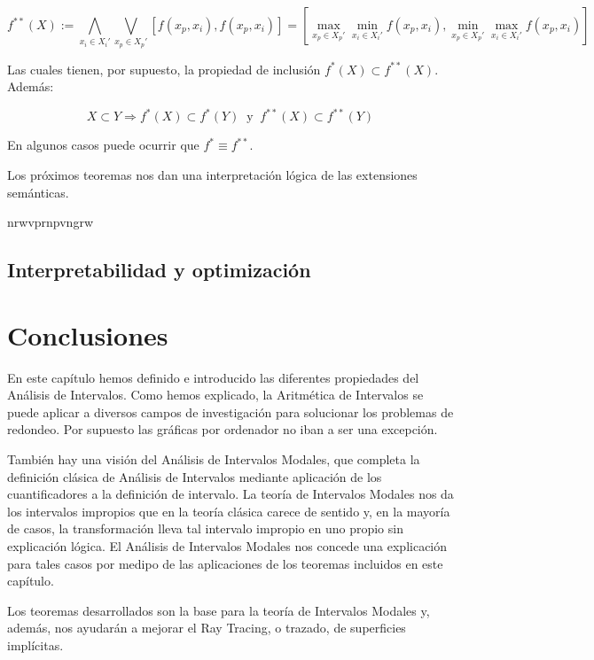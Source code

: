 \begin{equation}
f^{**}(X) := \bigwedge_{x_i \in X_i'} \bigvee_{x_p \in X_p'} [f(x_p,x_i),f(x_p,x_i)] = \left[ \max_{x_p \in X_p'} \min_{x_i \in X_i'} f(x_p,x_i), \min_{x_p \in X_p'} \max_{x_i \in X_i'} f(x_p,x_i) \right]
\nonumber
\end{equation}

Las cuales tienen, por supuesto, la propiedad de inclusión $f^*(X) \subset f^{**}(X)$. Además:

\begin{equation}
X \subset Y \Rightarrow f^*(X) \subset f^*(Y) \ \text{ y } \ f^{**}(X) \subset f^{**}(Y)
\nonumber
\end{equation}

En algunos casos puede ocurrir que $f^* \equiv f^{**}$.
\par Los próximos teoremas nos dan una interpretación lógica de las extensiones semánticas.

\begin{theorem}
nrwvprnpvngrw
\end{theorem}

\subsection{Interpretabilidad y optimización}

\section{Conclusiones}

En este capítulo hemos definido e introducido las diferentes propiedades del Análisis de Intervalos. Como hemos explicado, la Aritmética de Intervalos se puede aplicar a diversos campos de investigación para solucionar los problemas de redondeo. Por supuesto las gráficas por ordenador no iban a ser una excepción.
\par También hay una visión del Análisis de Intervalos Modales, que completa la definición clásica de Análisis de Intervalos mediante aplicación de los cuantificadores a la definición de intervalo. La teoría de Intervalos Modales nos da los intervalos impropios que en la teoría clásica carece de sentido y, en la mayoría de casos, la transformación lleva tal intervalo impropio en uno propio sin explicación lógica. El Análisis de Intervalos Modales nos concede una explicación para tales casos por medipo de las aplicaciones de los teoremas incluidos en este capítulo.
\par Los teoremas desarrollados son la base para la teoría de Intervalos Modales y, además, nos ayudarán a mejorar el Ray Tracing, o trazado, de superficies implícitas.